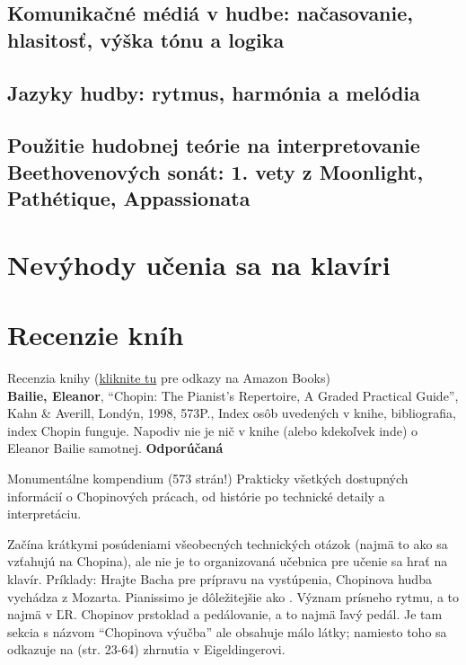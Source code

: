 \documentclass[11pt,a4paper%
]{article}
\newcommand{\noteDynamics}[2][1.3]{\raisebox{0.05ex}{\fontspec[Scale=#1]{Emmentaler-11}{#2}}}
\begin{document}
\subsection{Komunikačné médiá v hudbe: načasovanie, hlasitosť, výška tónu a logika}

\subsection{Jazyky hudby: rytmus, harmónia a melódia}

\subsection{Použitie hudobnej teórie na interpretovanie Beethovenových sonát: 1. vety z Moonlight, Pathétique, Appassionata}

\section{Nevýhody učenia sa na klavíri}

\section*{Recenzie kníh}
Recenzia knihy (\href{http://www.pianopractice.org/recommendedbooks.html}{kliknite tu} pre odkazy na Amazon Books)\\
\textbf{Bailie, Eleanor}, “Chopin: The Pianist's Repertoire, A Graded Practical Guide”, Kahn \& Averill, Londýn, 1998, 573P., Index osôb uvedených v knihe, bibliografia, index Chopin funguje. Napodiv nie je nič v knihe (alebo kdekoľvek inde) o Eleanor Bailie samotnej. \textbf{Odporúčaná}

Monumentálne kompendium (573 strán!) Prakticky všetkých dostupných informácií o Chopinových prácach, od histórie po technické detaily a interpretáciu.

Začína krátkymi posúdeniami všeobecných technických otázok (najmä to ako sa vzťahujú na Chopina), ale nie je to organizovaná učebnica pre učenie sa hrať na klavír. Príklady: Hrajte Bacha pre prípravu na vystúpenia, Chopinova hudba vychádza z Mozarta. Pianissimo je dôležitejšie ako \noteDynamics{ff}. Význam prísneho rytmu, a to najmä v ĽR. Chopinov prstoklad a pedálovanie, a to najmä ľavý pedál. Je tam sekcia s názvom “Chopinova výučba” ale obsahuje málo látky; namiesto toho sa odkazuje na (str. 23-64) zhrnutia v Eigeldingerovi.
\end{document}
